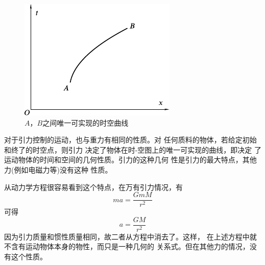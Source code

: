 \begin{figure}
  \centering
  \includegraphics{figure/fig04.08}
  \caption{$ A $，$ B $之间唯一可实现的时空曲线}
  \label{fig:04.08}
\end{figure}
对于引力控制的运动，也与重力有相同的性质。对
任何质料的物体，若给定初始和终了的时空点，则引力
决定了物体在时-空图上的唯一可实现的曲线，即决定
了运动物体的时间和空间的几何性质。引力的这种几何
性是引力的最大特点，其他力(例如电磁力等)没有这种
性质。

从动力学方程很容易看到这个特点，在万有引力情况，有
\begin{equation*}
  m a = \frac { G m M } { r ^ { 2 } }
\end{equation*}
可得
\begin{equation*}
  a = \frac { G M } { r ^ { 2 } }
\end{equation*}
因为引力质量和惯性质量相同，故二者从方程中消去了。这样，
\clearpage\noindent
在上述方程中就不含有运动物体本身的物性，而只是一种几何的
关系式。但在其他力的情况，没有这个性质。
